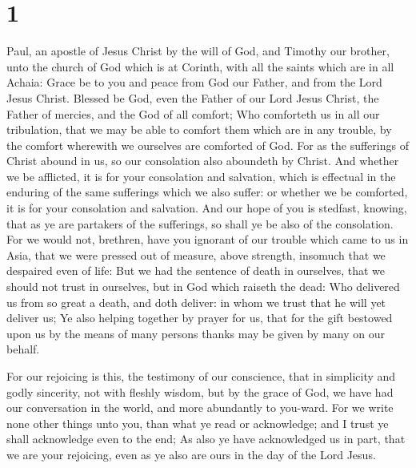 \hypertarget{section}{%
\section{1}\label{section}}

 Paul, an apostle of Jesus Christ by the will of God, and
Timothy our brother, unto the church of God which is at Corinth, with
all the saints which are in all Achaia:  Grace be to you and
peace from God our Father, and from the Lord Jesus Christ. 
Blessed be God, even the Father of our Lord Jesus Christ, the Father of
mercies, and the God of all comfort;  Who comforteth us in
all our tribulation, that we may be able to comfort them which are in
any trouble, by the comfort wherewith we ourselves are comforted of God.
 For as the sufferings of Christ abound in us, so our
consolation also aboundeth by Christ.  And whether we be
afflicted, it is for your consolation and salvation, which is effectual
in the enduring of the same sufferings which we also suffer: or whether
we be comforted, it is for your consolation and salvation. 
And our hope of you is stedfast, knowing, that as ye are partakers of
the sufferings, so shall ye be also of the consolation.  For
we would not, brethren, have you ignorant of our trouble which came to
us in Asia, that we were pressed out of measure, above strength,
insomuch that we despaired even of life:  But we had the
sentence of death in ourselves, that we should not trust in ourselves,
but in God which raiseth the dead:  Who delivered us from
so great a death, and doth deliver: in whom we trust that he will yet
deliver us;  Ye also helping together by prayer for us,
that for the gift bestowed upon us by the means of many persons thanks
may be given by many on our behalf.

 For our rejoicing is this, the testimony of our
conscience, that in simplicity and godly sincerity, not with fleshly
wisdom, but by the grace of God, we have had our conversation in the
world, and more abundantly to you-ward.  For we write none
other things unto you, than what ye read or acknowledge; and I trust ye
shall acknowledge even to the end;  As also ye have
acknowledged us in part, that we are your rejoicing, even as ye also are
ours in the day of the Lord Jesus.

